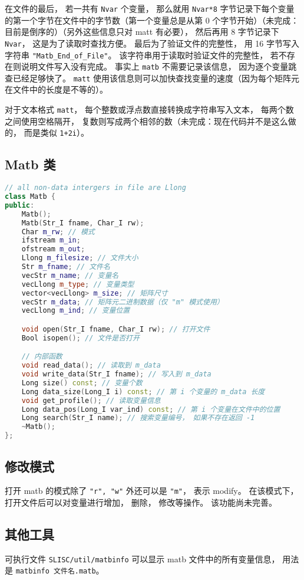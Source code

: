 在文件的最后， 若一共有 \verb`Nvar` 个变量， 那么就用 \verb`Nvar*8` 字节记录下每个变量的第一个字节在文件中的字节数（第一个变量总是从第 0 个字节开始）（未完成：目前是倒序的）（另外这些信息只对 matt 有必要）， 然后再用 8 字节记录下 \verb`Nvar`， 这是为了读取时查找方便。 最后为了验证文件的完整性， 用 16 字节写入字符串 \verb`"Matb_End_of_File"`。 该字符串用于读取时验证文件的完整性， 若不存在则说明文件写入没有完成。 事实上 \verb`matb` 不需要记录该信息， 因为逐个变量跳查已经足够快了。 \verb`matt` 使用该信息则可以加快查找变量的速度（因为每个矩阵元在文件中的长度是不等的）。

对于文本格式 \verb`matt`， 每个整数或浮点数直接转换成字符串写入文本， 每两个数之间使用空格隔开， 复数则写成两个相邻的数（未完成：现在代码并不是这么做的， 而是类似 \verb`1+2i`）。

\subsection{Matb 类}
\begin{lstlisting}[language=cpp]
// all non-data intergers in file are Llong
class Matb {
public:
    Matb();
    Matb(Str_I fname, Char_I rw);
    Char m_rw; // 模式
    ifstream m_in;
    ofstream m_out;
    Llong m_filesize; // 文件大小
    Str m_fname; // 文件名
    vecStr m_name; // 变量名
    vecLlong m_type; // 变量类型
    vector<vecLlong> m_size; // 矩阵尺寸
    vecStr m_data; // 矩阵元二进制数据（仅 "m" 模式使用）
    vecLlong m_ind; // 变量位置

    void open(Str_I fname, Char_I rw); // 打开文件
    Bool isopen(); // 文件是否打开

    // 内部函数
    void read_data(); // 读取到 m_data
    void write_data(Str_I fname); // 写入到 m_data
    Long size() const; // 变量个数
    Long data_size(Long_I i) const; // 第 i 个变量的 m_data 长度
    void get_profile(); // 读取变量信息
    Long data_pos(Long_I var_ind) const; // 第 i 个变量在文件中的位置
    Long search(Str_I name); // 搜索变量编号， 如果不存在返回 -1
    ~Matb();
};
\end{lstlisting}

\subsection{修改模式}
打开 matb 的模式除了 \verb`"r", "w"` 外还可以是 \verb`"m"`， 表示 modify。 在该模式下， 打开文件后可以对变量进行增加， 删除， 修改等操作。 该功能尚未完善。

\subsection{其他工具}
可执行文件 \verb`SLISC/util/matbinfo` 可以显示 matb 文件中的所有变量信息， 用法是 \verb`matbinfo 文件名.matb`。

